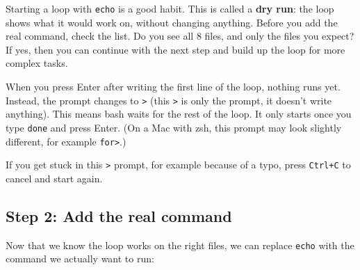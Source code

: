 \documentclass[
  letterpaper,
  DIV=11,
  numbers=noendperiod]{scrreprt}
\newenvironment{Shaded}{}{}
\newcommand{\AttributeTok}[1]{\textcolor[rgb]{0.84,0.23,0.29}{#1}}
\newcommand{\ControlFlowTok}[1]{\textcolor[rgb]{0.84,0.23,0.29}{#1}}
\newcommand{\FunctionTok}[1]{\textcolor[rgb]{0.44,0.26,0.76}{#1}}
\newcommand{\KeywordTok}[1]{\textcolor[rgb]{0.84,0.23,0.29}{#1}}
\newcommand{\NormalTok}[1]{\textcolor[rgb]{0.14,0.16,0.18}{#1}}
\newcommand{\PreprocessorTok}[1]{\textcolor[rgb]{0.84,0.23,0.29}{#1}}
\newcommand{\VariableTok}[1]{\textcolor[rgb]{0.89,0.38,0.04}{#1}}
\begin{document}
Starting a loop with \texttt{echo} is a good habit. This is called a
\textbf{dry run}: the loop shows what it would work on, without changing
anything. Before you add the real command, check the list. Do you see
all 8 files, and only the files you expect? If yes, then you can
continue with the next step and build up the loop for more complex
tasks.

\begin{tcolorbox}[enhanced jigsaw, coltitle=black, breakable, titlerule=0mm, colback=white, rightrule=.15mm, bottomrule=.15mm, toprule=.15mm, colframe=quarto-callout-tip-color-frame, colbacktitle=quarto-callout-tip-color!10!white, bottomtitle=1mm, opacitybacktitle=0.6, toptitle=1mm, leftrule=.75mm, arc=.35mm, title=\textcolor{quarto-callout-tip-color}{\faLightbulb}\hspace{0.5em}{Tip: Typing a loop in the terminal}, left=2mm, opacityback=0]

When you press Enter after writing the first line of the loop, nothing
runs yet. Instead, the prompt changes to \texttt{\textgreater{}} (this
\texttt{\textgreater{}} is only the prompt, it doesn't write anything).
This means bash waits for the rest of the loop. It only starts once you
type \texttt{done} and press Enter. (On a Mac with zsh, this prompt may
look slightly different, for example \texttt{for\textgreater{}}.)

If you get stuck in this \texttt{\textgreater{}} prompt, for example
because of a typo, press \texttt{Ctrl+C} to cancel and start again.

\end{tcolorbox}

\subsection{Step 2: Add the real
command}\label{step-2-add-the-real-command}

Now that we know the loop works on the right files, we can replace
\texttt{echo} with the command we actually want to run:

\begin{Shaded}
\end{Shaded}
\end{document}
